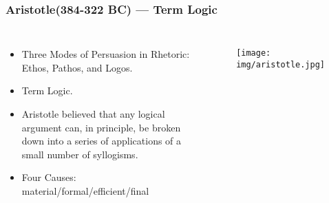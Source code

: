 \documentclass[UTF8,aspectratio=43,11pt,colorlinks,compress,openany]{beamer}%
\begin{document}
\begin{frame}\frametitle{Aristotle(384-322 BC) --- Term Logic}
	\begin{columns}
			\begin{itemize}
				\item Three Modes of Persuasion in Rhetoric: Ethos, Pathos, and Logos.
				\item Term Logic.
				\item Aristotle believed that any logical argument can, in principle, be broken down into a series of applications of a small number of syllogisms.
				\item Four Causes: material/formal/efficient/final
			\end{itemize}
			\begin{figure}
				\texttt{[image: img/aristotle.jpg]}
			\end{figure}
	\end{columns}
\end{frame}
\end{document}
